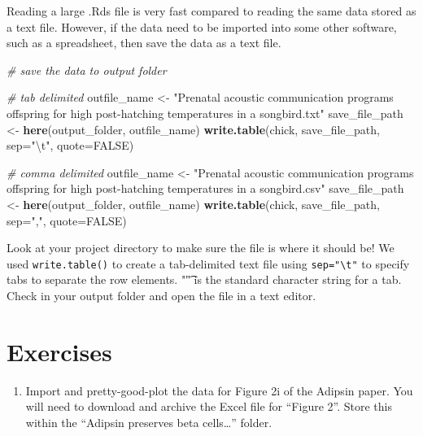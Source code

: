\documentclass[]{book}
\newenvironment{Shaded}{\begin{snugshade}}{\end{snugshade}}
\newcommand{\CharTok}[1]{\textcolor[rgb]{0.31,0.60,0.02}{#1}}
\newcommand{\CommentTok}[1]{\textcolor[rgb]{0.56,0.35,0.01}{\textit{#1}}}
\newcommand{\DataTypeTok}[1]{\textcolor[rgb]{0.13,0.29,0.53}{#1}}
\newcommand{\KeywordTok}[1]{\textcolor[rgb]{0.13,0.29,0.53}{\textbf{#1}}}
\newcommand{\NormalTok}[1]{#1}
\newcommand{\OtherTok}[1]{\textcolor[rgb]{0.56,0.35,0.01}{#1}}
\newcommand{\StringTok}[1]{\textcolor[rgb]{0.31,0.60,0.02}{#1}}
\providecommand{\tightlist}{%
  \setlength{\itemsep}{0pt}\setlength{\parskip}{0pt}}
\begin{document}
Reading a large .Rds file is very fast compared to reading the same data stored as a text file. However, if the data need to be imported into some other software, such as a spreadsheet, then save the data as a text file.

\begin{Shaded}
\begin{Highlighting}[]
\CommentTok{# save the data to output folder}

\CommentTok{# tab delimited}
\NormalTok{outfile_name <-}\StringTok{ "Prenatal acoustic communication programs offspring for high post-hatching temperatures in a songbird.txt"}
\NormalTok{save_file_path <-}\StringTok{ }\KeywordTok{here}\NormalTok{(output_folder, outfile_name)}
\KeywordTok{write.table}\NormalTok{(chick, save_file_path, }\DataTypeTok{sep=}\StringTok{"}\CharTok{\textbackslash{}t}\StringTok{"}\NormalTok{, }\DataTypeTok{quote=}\OtherTok{FALSE}\NormalTok{)}

\CommentTok{# comma delimited}
\NormalTok{outfile_name <-}\StringTok{ "Prenatal acoustic communication programs offspring for high post-hatching temperatures in a songbird.csv"}
\NormalTok{save_file_path <-}\StringTok{ }\KeywordTok{here}\NormalTok{(output_folder, outfile_name)}
\KeywordTok{write.table}\NormalTok{(chick, save_file_path, }\DataTypeTok{sep=}\StringTok{","}\NormalTok{, }\DataTypeTok{quote=}\OtherTok{FALSE}\NormalTok{)}
\end{Highlighting}
\end{Shaded}

Look at your project directory to make sure the file is where it should be! We used \texttt{write.table()} to create a tab-delimited text file using \texttt{sep="\textbackslash{}t"} to specify tabs to separate the row elements. "\t" is the standard character string for a tab. Check in your output folder and open the file in a text editor.

\hypertarget{exercises-1}{%
\section{Exercises}\label{exercises-1}}

\begin{enumerate}
\def\labelenumi{\arabic{enumi}.}
\tightlist
\item
  Import and pretty-good-plot the data for Figure 2i of the Adipsin paper. You will need to download and archive the Excel file for ``Figure 2''. Store this within the ``Adipsin preserves beta cells\ldots{}'' folder.
\end{enumerate}
\end{document}
